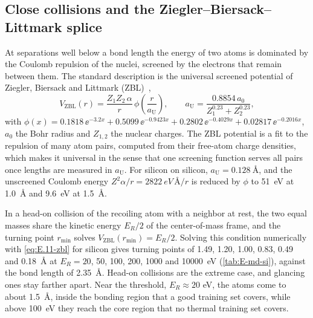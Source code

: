 \subsection{Close collisions and the Ziegler--Biersack--Littmark splice}

At separations well below a bond length the energy of two atoms is dominated by the Coulomb repulsion of the nuclei, screened by the electrons that remain between them. The standard description is the universal screened potential of Ziegler, Biersack and Littmark (ZBL)~\cite[Chap.~2]{ziegler1985stopping},
\begin{equation}
  V_{\mathrm{ZBL}}(r) = \frac{Z_1 Z_2\,\alpha}{r}\,\phi\!\left(\frac{r}{a_{\mathrm{U}}}\right), \qquad
  a_{\mathrm{U}} = \frac{0.8854\,a_0}{Z_1^{0.23} + Z_2^{0.23}},
  \label{eq:E.11-zbl}
\end{equation}
with $\phi(x) = 0.1818\,\ee^{-3.2x} + 0.5099\,\ee^{-0.9423x} + 0.2802\,\ee^{-0.4029x} + 0.02817\,\ee^{-0.2016x}$, $a_0$ the Bohr radius and $Z_{1,2}$ the nuclear charges. The ZBL potential is a fit to the repulsion of many atom pairs, computed from their free-atom charge densities, which makes it universal in the sense that one screening function serves all pairs once lengths are measured in $a_{\mathrm{U}}$. For silicon on silicon, $a_{\mathrm{U}} = \SI{0.128}{\angstrom}$, and the unscreened Coulomb energy $Z^2\alpha/r = \SI{2822}{eV\,\angstrom}/r$ is reduced by $\phi$ to \SI{51}{eV} at \SI{1.0}{\angstrom} and \SI{9.6}{eV} at \SI{1.5}{\angstrom}.

In a head-on collision of the recoiling atom with a neighbor at rest, the two equal masses share the kinetic energy $E_R/2$ of the center-of-mass frame, and the turning point $r_{\mathrm{min}}$ solves $V_{\mathrm{ZBL}}(r_{\mathrm{min}}) = E_R/2$. Solving this condition numerically with \cref{eq:E.11-zbl} for silicon gives turning points of 1.49, 1.20, 1.00, 0.83, 0.49 and \SI{0.18}{\angstrom} at $E_R = 20$, 50, 100, 200, 1000 and \SI{10000}{eV} (\cref{tab:E-md-si}), against the bond length of \SI{2.35}{\angstrom}. Head-on collisions are the extreme case, and glancing ones stay farther apart. Near the threshold, $E_R \approx 20$ eV, the atoms come to about \SI{1.5}{\angstrom}, inside the bonding region that a good training set covers, while above \SI{100}{eV} they reach the core region that no thermal training set covers.

